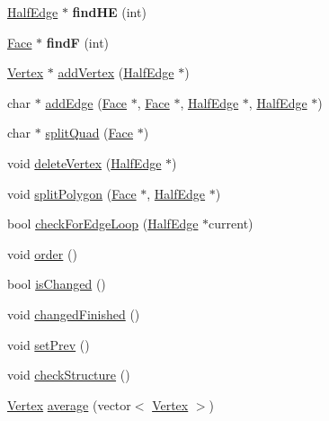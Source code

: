 \begin{DoxyCompactItemize}
\item 
\hypertarget{class_mesh_ac82e9fb4db3496a7a96bac4cb413efc6}{\hyperlink{class_half_edge}{Half\-Edge} $\ast$ {\bfseries find\-H\-E} (int)}\label{class_mesh_ac82e9fb4db3496a7a96bac4cb413efc6}

\item 
\hypertarget{class_mesh_a2bdd7b3c36c4e2a0d41044c5607dad92}{\hyperlink{class_face}{Face} $\ast$ {\bfseries find\-F} (int)}\label{class_mesh_a2bdd7b3c36c4e2a0d41044c5607dad92}

\item 
\hyperlink{class_vertex}{Vertex} $\ast$ \hyperlink{class_mesh_ac41d81f62a5e2eda2382c617ee5799e3}{add\-Vertex} (\hyperlink{class_half_edge}{Half\-Edge} $\ast$)
\item 
char $\ast$ \hyperlink{class_mesh_af56427919d906c5e8f1ec2fbee349e18}{add\-Edge} (\hyperlink{class_face}{Face} $\ast$, \hyperlink{class_face}{Face} $\ast$, \hyperlink{class_half_edge}{Half\-Edge} $\ast$, \hyperlink{class_half_edge}{Half\-Edge} $\ast$)
\item 
char $\ast$ \hyperlink{class_mesh_a4ba8b584ee4da42b3c7bfe664bc4a4d0}{split\-Quad} (\hyperlink{class_face}{Face} $\ast$)
\item 
void \hyperlink{class_mesh_ae2b9608f157116831b2504caed3db841}{delete\-Vertex} (\hyperlink{class_half_edge}{Half\-Edge} $\ast$)
\item 
void \hyperlink{class_mesh_a538aa6c1eee9a26b2bae9007ad5c4559}{split\-Polygon} (\hyperlink{class_face}{Face} $\ast$, \hyperlink{class_half_edge}{Half\-Edge} $\ast$)
\item 
bool \hyperlink{class_mesh_ac70eaa218e7a870d23ee467e0df8a74e}{check\-For\-Edge\-Loop} (\hyperlink{class_half_edge}{Half\-Edge} $\ast$current)
\item 
void \hyperlink{class_mesh_ab889a89b9da7add88e75393e2eeca049}{order} ()
\item 
bool \hyperlink{class_mesh_a8471897ccd4647bc8c79bf8a0388b0de}{is\-Changed} ()
\item 
void \hyperlink{class_mesh_a4043c44812786af6618c2e3b3bb38187}{changed\-Finished} ()
\item 
void \hyperlink{class_mesh_abfd027aacf682a7443a5e62731041f59}{set\-Prev} ()
\item 
void \hyperlink{class_mesh_aac71d69ad87090293879832e52876345}{check\-Structure} ()
\item 
\hyperlink{class_vertex}{Vertex} \hyperlink{class_mesh_afc611783d2325ca3337ec4c2a9c60fe7}{average} (vector$<$ \hyperlink{class_vertex}{Vertex} $>$)

\end{DoxyCompactItemize}
